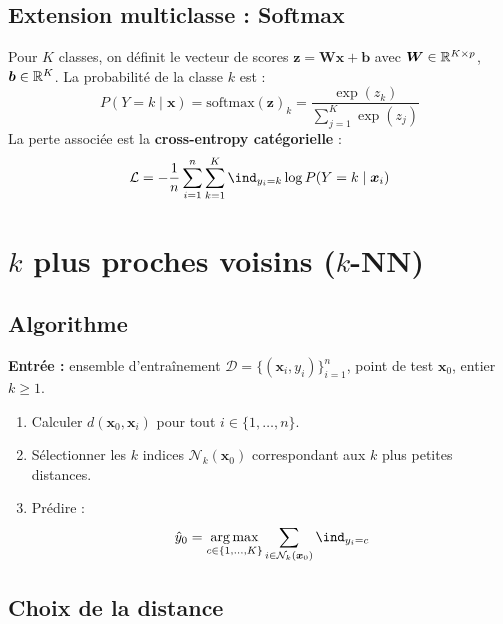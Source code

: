 \subsection{Extension multiclasse : Softmax}

\begin{definition}
Pour $K$ classes, on d\'efinit le vecteur de scores $\bm{z} = \bm{W}\bm{x} + \bm{b}$
avec $\bm{W} \in \mathbb{R}^{K \times p}$, $\bm{b} \in \mathbb{R}^K$. La probabilit\'e de la classe $k$ est :
\[
  P(Y = k \mid \bm{x}) = \text{softmax}(\bm{z})_k
  = \frac{\exp(z_k)}{\sum_{j=1}^{K}\exp(z_j)}
\]
La perte associ\'ee est la \textbf{cross-entropy cat\'egorielle} :
\[
  \mathcal{L} = -\frac{1}{n}\sum_{i=1}^{n}\sum_{k=1}^{K}
  \ind_{y_i = k} \log P(Y = k \mid \bm{x}_i)
\]
\end{definition}

\section{$k$ plus proches voisins ($k$-NN)}
\label{sec:knn}

\subsection{Algorithme}

\begin{algorithme}[title=\textbf{Classification par $k$-NN}]
\textbf{Entr\'ee :} ensemble d'entra\^inement $\mathcal{D} = \{(\bm{x}_i, y_i)\}_{i=1}^{n}$,
point de test $\bm{x}_0$, entier $k \geq 1$.

\begin{enumerate}
  \item Calculer $d(\bm{x}_0, \bm{x}_i)$ pour tout $i \in \{1, \ldots, n\}$.
  \item S\'electionner les $k$ indices $\mathcal{N}_k(\bm{x}_0)$ correspondant aux
        $k$ plus petites distances.
  \item Pr\'edire :
  \[
    \hat{y}_0 = \argmax_{c \in \{1,\ldots,K\}} \sum_{i \in \mathcal{N}_k(\bm{x}_0)} \ind_{y_i = c}
  \]
\end{enumerate}
\end{algorithme}

\subsection{Choix de la distance}

